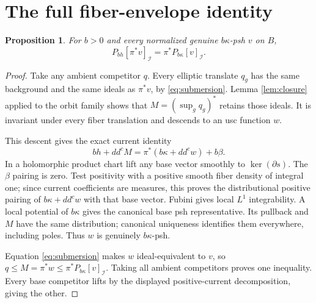 \documentclass[11pt]{article}
\newcommand{\ddc}{dd^c}
\newcommand{\PI}[2]{P_{#1}[#2]_{\mathcal I}}
\newtheorem{proposition}[theorem]{Proposition}
\begin{document}
\section{The full fiber-envelope identity}
\begin{proposition}\label{prop:fiber}
For $b>0$ and every normalized genuine $b\kappa$-psh $v$ on $B$,
\[
 \PI{bh}{\pi^*v}=\pi^*\PI{b\kappa}{v}.
\]
\end{proposition}
\begin{proof}
Take any ambient competitor $q$. Every elliptic translate $q_g$ has
the same background and the same ideals as $\pi^*v$, by
\eqref{eq:submersion}. Lemma \ref{lem:closure} applied to the orbit
family shows that $M=(\sup_gq_g)^*$ retains those ideals. It is invariant
under every fiber translation and descends to an usc function $w$.

This descent gives the exact current identity
\[
 bh+\ddc M=\pi^*(b\kappa+\ddc w)+b\beta.
\]
In a holomorphic product chart lift any base vector smoothly to
$\ker(\partial s)$. The $\beta$ pairing is zero. Test positivity with
a positive smooth fiber density of integral one; since current coefficients
are measures, this proves the distributional positive pairing of
$b\kappa+\ddc w$ with that base vector. Fubini gives local $L^1$
integrability. A local potential of $b\kappa$ gives the canonical base
psh representative. Its pullback and $M$ have the same distribution;
canonical uniqueness identifies them everywhere, including poles.
Thus $w$ is genuinely $b\kappa$-psh.

Equation \eqref{eq:submersion} makes $w$ ideal-equivalent to $v$, so
$q\leq M=\pi^*w\leq\pi^*\PI{b\kappa}{v}$. Taking all ambient
competitors proves one inequality. Every base competitor lifts by the
displayed positive-current decomposition, giving the other.
\end{proof}
\end{document}
